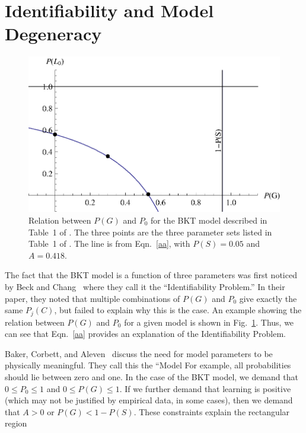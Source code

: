 \documentclass[11pt,letterpaper]{article}
\begin{document}
\section{Identifiability and Model Degeneracy}


\begin{figure}
\centering\includegraphics{table1.eps}
\caption{Relation between $P(G)$ and $P_0$ for the BKT model
  described in Table~1 of \cite{beck_identifiability:_2007}.  
  The three points are the
  three parameter sets listed in Table~1 of \cite{beck_identifiability:_2007}.
   The line is from Eqn.~\ref{aa}, with $P(S)=0.05$ and $A=0.418$. }
 \label{table1}
\end{figure}


The fact that the BKT model is a function of three parameters
was first noticed by Beck and Chang~\cite{beck_identifiability:_2007} 
where they call it the ``Identifiability Problem.''   In their paper, 
they noted that multiple
combinations of $P(G)$ and $P_0$ give exactly the same $P_j(C)$, but
failed to explain why this is the case.  An example showing the relation
between $P(G)$ and $P_0$ for a given model is shown in Fig.~\ref{table1}.
Thus, we can see that Eqn.~\ref{aa} provides an explanation of the
Identifiability Problem.

Baker, Corbett, and Aleven~\cite{baker_more_2008} discuss the need for 
model parameters to be physically meaningful.  They call this the
``Model   For example, all probabilities should lie between zero and one.  
In the case of the BKT model, we demand that $0\le P_0\le 1$ and
 $0\le P(G) \le 1$.
If we further demand that learning is positive (which may not be justified
by empirical data, in some cases), then we demand that $A>0$ or $P(G)<1-P(S)$.
These constraints explain the rectangular region 
\end{document}
